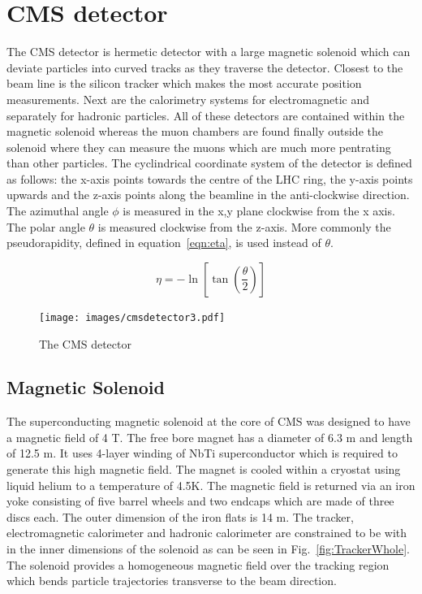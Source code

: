 \section{CMS detector \label{sec:CMSdet}}

The CMS detector is hermetic detector with a large magnetic solenoid which can deviate particles into curved tracks as they traverse the detector. Closest to the beam line is the silicon tracker which makes the most accurate position measurements. Next are the calorimetry systems for electromagnetic and separately for hadronic particles. All of these detectors are contained within the magnetic solenoid whereas the muon chambers are found finally outside the solenoid where they can measure the muons which are much more pentrating than other particles. The cyclindrical coordinate system of the detector is defined as follows: the x-axis points towards the centre of the LHC ring, the y-axis points upwards and the z-axis points along the beamline in the anti-clockwise direction. The azimuthal angle $\phi$ is measured in the x,y plane clockwise from the x axis. The polar angle $\theta$ is measured clockwise from the z-axis. More commonly the pseudorapidity, defined in equation~\ref{eqn:eta}, is used instead of $\theta$.

\begin{equation}
    \eta = - \ln \left[ \tan \left(\frac{\theta}{2} \right) \right]
    \label{eqn:eta}
\end{equation}

\begin{figure}[ht!]
\centering
    \texttt{[image: images/cmsdetector3.pdf]}
    \caption{The CMS detector~\cite{1742-6596-513-2-022032}}
    \label{fig:CMSdetector}
\end{figure}


\subsection{Magnetic Solenoid}

The superconducting magnetic solenoid at the core of CMS was designed to have a magnetic field of 4 T. The free bore magnet has a diameter of 6.3 m and length of 12.5 m. It uses 4-layer winding of NbTi superconductor which is required to generate this high magnetic field. The magnet is cooled within a cryostat using liquid helium to a temperature of 4.5K. The magnetic field is returned via an iron yoke consisting of five barrel wheels and two endcaps which are made of three discs each. The outer dimension of the iron flats is 14 m. The tracker, electromagnetic calorimeter and hadronic calorimeter are constrained to be with in the inner dimensions of the solenoid as can be seen in Fig.~\ref{fig:TrackerWhole}. The solenoid provides a homogeneous magnetic field over the tracking region which bends particle trajectories transverse to the beam direction.

